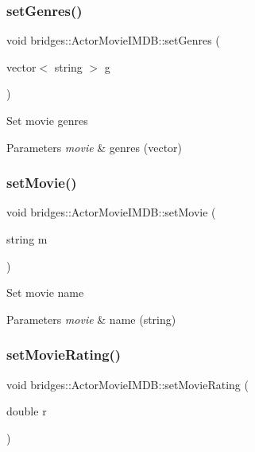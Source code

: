 \subsubsection{\texorpdfstring{set\+Genres()}{setGenres()}}
{\footnotesize\ttfamily void bridges\+::\+Actor\+Movie\+I\+M\+D\+B\+::set\+Genres (\begin{DoxyParamCaption}\item[{vector$<$ string $>$}]{g }\end{DoxyParamCaption})\hspace{0.3cm}{\ttfamily [inline]}}

Set movie genres


\begin{DoxyParams}{Parameters}
{\em movie} & genres (vector) \\
\hline
\end{DoxyParams}
\mbox{\label{classbridges_1_1_actor_movie_i_m_d_b_a08b64b8728a59a08bb565c8556b01509}} 
\subsubsection{\texorpdfstring{set\+Movie()}{setMovie()}}
{\footnotesize\ttfamily void bridges\+::\+Actor\+Movie\+I\+M\+D\+B\+::set\+Movie (\begin{DoxyParamCaption}\item[{string}]{m }\end{DoxyParamCaption})\hspace{0.3cm}{\ttfamily [inline]}}

Set movie name


\begin{DoxyParams}{Parameters}
{\em movie} & name (string) \\
\hline
\end{DoxyParams}
\mbox{\label{classbridges_1_1_actor_movie_i_m_d_b_aea16db5315526ff31a1685c08390cdc7}} 
\subsubsection{\texorpdfstring{set\+Movie\+Rating()}{setMovieRating()}}
{\footnotesize\ttfamily void bridges\+::\+Actor\+Movie\+I\+M\+D\+B\+::set\+Movie\+Rating (\begin{DoxyParamCaption}\item[{double}]{r }\end{DoxyParamCaption})\hspace{0.3cm}{\ttfamily [inline]}}


